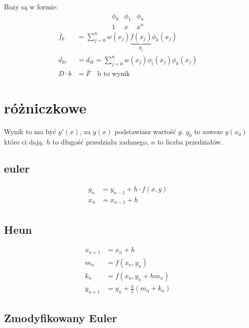 \documentclass[a5paper,10pt]{article}
\begin{document}
\begin{multicols}{2}
    Bazy są w formie: 
    \[
        \begin{matrix}
            \phi_0  & \phi_1 & \phi_n \\
            1       & x      & x^{n}
        \end{matrix}
    \]
    \begin{align*}
        \bar{f}_k &= \sum^n_{j=0} w\left( x_j \right) \underbrace{f\left( x_j
            \right)}_{y_j} \phi_k\left( x_j \right) \\
            d_{ki} &= d_{ik} = \sum^n_{j=0} w\left( x_j \right) \phi_i\left( x_j
            \right) \phi_k\left( x_j \right) \\
            D \cdot b &= \bar{F} \quad \text{b to wynik}
    \end{align*}


    \section{różniczkowe}

    Wynik to ma być $y'(x)$, za $y\left(x\right)$ podstawiasz wartość $y$.
    $y_0$ to zawsze $y\left( x_0 \right)$ które ci dają. $h$ to długość
    przedziału zadanego, $n$ to liczba przedziałów.

    \subsection{euler}

    \begin{align*}
        y_n &= y_{n - 1} + h \cdot f\left( x, y \right) \\
        x_n &= x_{n - 1} + h \\
    \end{align*}

    \subsection{Heun}

    \begin{align*}
        x_{n + 1} &= x_{n} + h \\
        m_n &= f(x_n, y_n) \\
        k_n &= f\left( x_n, y_n + hm_n \right)\\
        y_{n+1} &= y_n + \frac{h}{2}\left( m_n + k_n \right)
    \end{align*}
    
    \subsection{Zmodyfikowany Euler}


\end{multicols}
\end{document}
